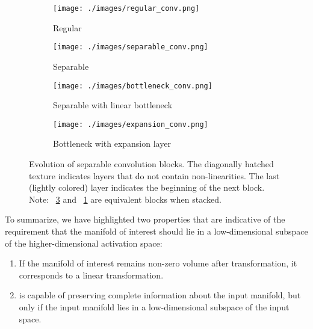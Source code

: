 \documentclass[10pt,twocolumn,letterpaper]{article}
\begin{document}
\begin{figure}[!t]
  \centering
  \begin{subfigure}{.2\textwidth}
    \centering
    \caption {Regular}
    \texttt{[image: ./images/regular\_conv.png]}
  \end{subfigure}
  \begin{subfigure}{.2\textwidth}
\caption {Separable}
    \texttt{[image: ./images/separable\_conv.png]}
  \end{subfigure}

\vspace{10pt}
  \begin{subfigure}{.2\textwidth}
    \caption{Separable with linear bottleneck}
    \label{fig:bneck}
    \texttt{[image: ./images/bottleneck\_conv.png]}
  \end{subfigure} \hspace{15pt}
  \begin{subfigure}{.2\textwidth}
    \caption{Bottleneck with expansion layer}
    \label{fig:exp}
    \texttt{[image: ./images/expansion\_conv.png]}
  \end{subfigure}
  \caption{\small{
    Evolution of separable convolution blocks. The diagonally hatched texture indicates
    layers that do not contain non-linearities.
    The last (lightly colored) layer indicates the beginning of the next block. Note: ~\ref{fig:exp} and
    ~\ref{fig:bneck} are equivalent blocks when stacked. \beveco }
  }
\end{figure}

To summarize, we have highlighted two properties that are indicative of 
the requirement that the manifold of interest should lie in a low-dimensional 
subspace of the higher-dimensional activation space:




\begin{enumerate}
  \item If the manifold of interest remains non-zero volume after  transformation, it corresponds to a linear transformation.
  \item  is capable of preserving complete information about the input manifold, but only if the input manifold lies in a low-dimensional subspace of the input space.
\end{enumerate}
\end{document}
